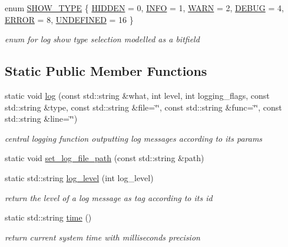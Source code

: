 \begin{DoxyCompactItemize}
enum \mbox{\hyperlink{class_log_a137fb16cb3316a43a396d619034e4b7b}{S\+H\+O\+W\+\_\+\+T\+Y\+PE}} \{ \newline
\mbox{\hyperlink{class_log_a137fb16cb3316a43a396d619034e4b7bab40ceb671aedfc584f90de5e18088516}{H\+I\+D\+D\+EN}} = 0, 
\mbox{\hyperlink{class_log_a137fb16cb3316a43a396d619034e4b7ba8ddc7ebe42544ebab9b3d6cf49ab33d8}{I\+N\+FO}} = 1, 
\mbox{\hyperlink{class_log_a137fb16cb3316a43a396d619034e4b7bac377fc59ba8e467c14769baa39c70baa}{W\+A\+RN}} = 2, 
\mbox{\hyperlink{class_log_a137fb16cb3316a43a396d619034e4b7ba4e49113de847d4ce568b7f0d5647a715}{D\+E\+B\+UG}} = 4, 
\newline
\mbox{\hyperlink{class_log_a137fb16cb3316a43a396d619034e4b7ba4cd0be82d98ca2a542adc75f2c826e5b}{E\+R\+R\+OR}} = 8, 
\mbox{\hyperlink{class_log_a137fb16cb3316a43a396d619034e4b7ba21e9c1c99b8ddefbd9343b026393bc2a}{U\+N\+D\+E\+F\+I\+N\+ED}} = 16
 \}
\begin{DoxyCompactList}\small\item\em enum for log show type selection modelled as a bitfield \end{DoxyCompactList}\end{DoxyCompactItemize}
\subsection*{Static Public Member Functions}
\begin{DoxyCompactItemize}
\item 
static void \mbox{\hyperlink{class_log_aa761204a7477ab8376b7ccf4e9b4e801}{log}} (const std\+::string \&what, int level, int logging\+\_\+flags, const std\+::string \&type, const std\+::string \&file=\char`\"{}\char`\"{}, const std\+::string \&func=\char`\"{}\char`\"{}, const std\+::string \&line=\char`\"{}\char`\"{})
\begin{DoxyCompactList}\small\item\em central logging function outputting log messages according to its params \end{DoxyCompactList}\item 
static void \mbox{\hyperlink{class_log_afa51df02f0cc80fbab4530930440129b}{set\+\_\+log\+\_\+file\+\_\+path}} (const std\+::string \&path)
\item 
static std\+::string \mbox{\hyperlink{class_log_ad722eb74a86fa6089c73493f143e7ae3}{log\+\_\+level}} (int log\+\_\+level)
\begin{DoxyCompactList}\small\item\em return the level of a log message as tag according to its id \end{DoxyCompactList}\item 
static std\+::string \mbox{\hyperlink{class_log_a65958a4fb560f3e666be0045e312a1b6}{time}} ()
\begin{DoxyCompactList}\small\item\em return current system time with milliseconds precision \end{DoxyCompactList}\end{DoxyCompactItemize}
